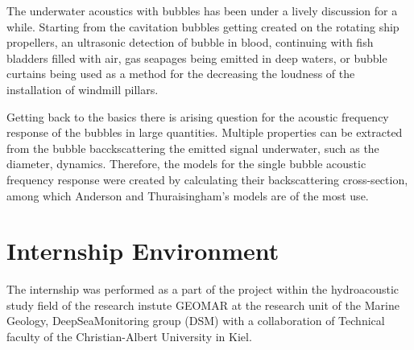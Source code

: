 


The underwater acoustics with bubbles has been under a lively discussion for a while. Starting from the cavitation bubbles getting created on the rotating ship propellers, an ultrasonic detection of bubble in blood, continuing  with fish bladders filled with air, gas seapages being emitted in deep waters, or bubble curtains being used as a method for the decreasing the loudness of the installation of windmill pillars.

Getting back to the basics there is arising question for the acoustic frequency response of the bubbles in large quantities. Multiple properties can be extracted from the bubble bacckscattering the emitted signal underwater, such as the diameter, dynamics. Therefore, the models for the single bubble acoustic frequency response were created by calculating their backscattering cross-section, among which Anderson and Thuraisingham's models are of the most use.

\section{Internship Environment}
The internship was performed as a part of the project within the hydroacoustic study field of the research instute GEOMAR at the research unit of the Marine Geology, DeepSeaMonitoring group (DSM) with a collaboration of Technical faculty of the Christian-Albert University in Kiel. 

